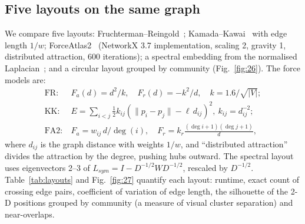 \subsection{Five layouts on the same graph}
We compare five layouts: Fruchterman--Reingold~\cite{fruchterman1991}; Kamada--Kawai~\cite{kamada1989} with edge length
$1/w$; ForceAtlas2~\cite{jacomy2014} (NetworkX 3.7 implementation, scaling 2, gravity 1, distributed attraction, 600
iterations); a spectral embedding from the normalised Laplacian~\cite{shi2000,ng2001}; and a circular layout grouped by
community (Fig.~\ref{fig:26}). The force models are:
\begin{align}
\text{FR:}\ & F_a(d)=d^2/k,\quad F_r(d)=-k^2/d,\quad k=1.6/\sqrt{|V|};\\
\text{KK:}\ & E=\textstyle\sum_{i<j}\tfrac{1}{2}k_{ij}(\lVert p_i-p_j\rVert-\ell\,d_{ij})^2,\ k_{ij}=d_{ij}^{-2};\\
\text{FA2:}\ & F_a=w_{ij}\,d/\deg(i),\quad F_r=k_r\frac{(\deg i+1)(\deg j+1)}{d},
\end{align}
where $d_{ij}$ is the graph distance with weights $1/w$, and ``distributed attraction'' divides the attraction by the
degree, pushing hubs outward. The spectral layout uses eigenvectors 2--3 of
$L_{sym}=I-D^{-1/2}WD^{-1/2}$, rescaled by $D^{-1/2}$. Table~\ref{tab:layouts} and Fig.~\ref{fig:27} quantify each layout:
runtime, exact count of crossing edge pairs, coefficient of variation of edge length, the silhouette of the 2-D positions
grouped by community (a measure of visual cluster separation) and near-overlaps.



